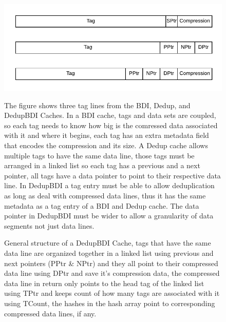 \begin{figure}
    \includegraphics[width=\textwidth]{BDIvsDedupvsDedupBDI_Tag.pdf}
    \label{fig:DedupBDI_Tag}
    \caption[DedupBDI Tag Array]{The figure shows three tag lines from the BDI, Dedup, and DedupBDI Caches. In a BDI cache, tags and data sets are coupled, so each tag needs to know how big is the comressed data associated with it and where it begins, each tag has an extra metadata field that encodes the compression and its size. A Dedup cache allows multiple tags to have the same data line, those tags must be arranged in a linked list so each tag has a previous and a next pointer, all tags have a data pointer to point to their respective data line. In DedupBDI a tag entry must be able to allow deduplication as long as deal with compressed data lines, thus it has the same metadata as a tag entry of a BDI and Dedup cache. The data pointer in DedupBDI must be wider to allow a granularity of data segments not just data lines.}
\end{figure}
\begin{figure}
    \label{fig:DedupBDI}
    \caption[DedupBDI Cache]{General structure of a DedupBDI Cache, tags that have the same data line are organized together in a linked list using previous and next pointers (PPtr \& NPtr) and they all point to their compressed data line using DPtr and save it's compression data, the compressed data line in return only points to the head tag of the linked list using TPtr and keeps count of how many tags are associated with it using TCount, the hashes in the hash array point to corresponding compressed data lines, if any.}
\end{figure}
